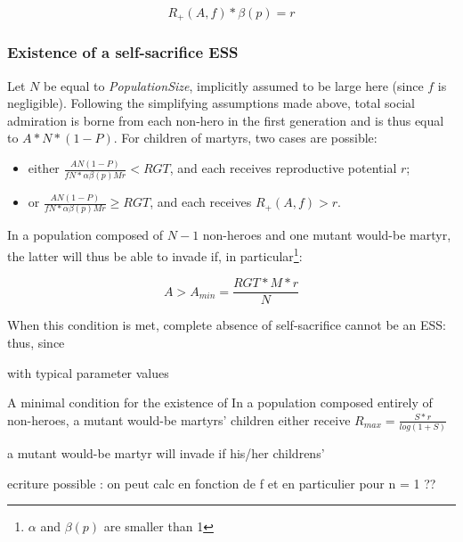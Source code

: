 \documentclass[a4paper,12pt]{article}
\begin{document}
\begin{equation}
    R_+(A,f)*\beta(p) = r
\label{eq:grandchildren}
\end{equation}


\subsubsection{Existence of a self-sacrifice ESS}
\label{ss: exo_existence}

Let $N$ be equal to \emph{PopulationSize}, implicitly assumed to be large here (since $f$
is negligible). Following the simplifying assumptions made above, total social admiration is
borne from each non-hero in the first generation and is thus equal to $A*N*(1-P)$. For children
of martyrs, two cases are possible:

\begin{itemize}
\item either $\frac{AN(1-P)}{fN*\alpha\beta(p)Mr} < RGT$, and each receives reproductive potential $r$;
\item or $\frac{AN(1-P)}{fN*\alpha\beta(p)Mr} \geq RGT$, and each receives $R_{+}(A,f)>r$.
\end{itemize}

In a population composed of $N-1$ non-heroes and one mutant would-be martyr, the latter will
thus be able to invade if, in particular\footnote{$\alpha$ and $\beta(p)$ are smaller than 1}:

\begin{equation}
    A > A_{min} = \frac{RGT*M*r}{N} 
\label{eq:ESS}
\end{equation}

When this condition is met, complete absence of self-sacrifice cannot be an ESS: thus, since 


{ with typical parameter values}

A minimal condition for the existence of 
In a population composed entirely of non-heroes, a mutant would-be martyrs'
children either receive $R_{max} = \frac{S*r}{log(1+S)}$

a mutant would-be martyr
will invade if his/her childrens' 


ecriture possible : on peut calc en fonction de f 
et en particulier pour n = 1 ??


\end{document}
